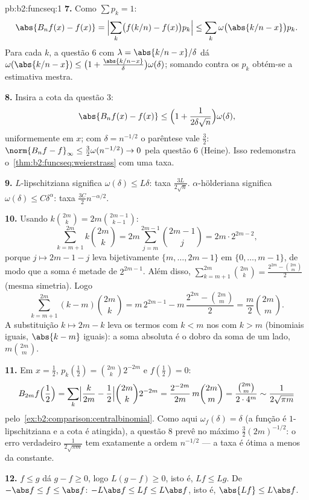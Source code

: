 \begin{solution}{pb:b2:funcseq:1}
\textbf{7.} Como $\sum p_k = 1$:
\[
\abs{B_nf(x) - f(x)}
= \Bigl|\sum_k\bigl(f(k/n) - f(x)\bigr)p_k\Bigr|
\leq \sum_k\omega\bigl(\abs{k/n - x}\bigr)p_k .
\]
Para cada $k$, a questão 6 com $\lambda = \abs{k/n - x}/\delta$
dá $\omega(\abs{k/n-x}) \leq \bigl(1 +
\frac{\abs{k/n-x}}\delta\bigr)\omega(\delta)$; somando contra
os $p_k$ obtém-se a estimativa mestra.

\textbf{8.} Insira a cota da questão 3:
\[
\abs{B_nf(x) - f(x)} \leq \Bigl(1 +
\frac{1}{2\delta\sqrt n}\Bigr)\omega(\delta),
\]
uniformemente em $x$; com $\delta = n^{-1/2}$ o parêntese vale
$\frac32$: $\norm{B_nf - f}_\infty \leq
\frac32\omega(n^{-1/2}) \to 0$ pela questão 6 (Heine). Isso
redemonstra o~\cref{thm:b2:funcseq:weierstrass} com uma taxa.

\textbf{9.} $L$-lipschitziana significa $\omega(\delta) \leq L\delta$:
taxa $\frac{3L}{2\sqrt n}$. $\alpha$-hölderiana significa
$\omega(\delta) \leq C\delta^\alpha$: taxa $\frac{3C}{2}
n^{-\alpha/2}$.

\textbf{10.} Usando $k\binom{2m}k = 2m\binom{2m-1}{k-1}$:
\[
\sum_{k=m+1}^{2m}k\binom{2m}k
= 2m\sum_{j=m}^{2m-1}\binom{2m-1}{j}
= 2m\cdot 2^{2m-2},
\]
porque $j \mapsto 2m-1-j$ leva bijetivamente $\{m,\dots,2m-1\}$ em
$\{0,\dots,m-1\}$, de modo que a soma é metade de $2^{2m-1}$. Além disso,
$\sum_{k=m+1}^{2m}\binom{2m}k = \frac{2^{2m} -
\binom{2m}m}{2}$ (mesma simetria). Logo
\[
\sum_{k=m+1}^{2m}(k-m)\binom{2m}k
= m\,2^{2m-1} - m\,\frac{2^{2m} - \binom{2m}m}{2}
= \frac m2\binom{2m}m .
\]
A substituição $k \mapsto 2m-k$ leva os termos com $k < m$
nos com $k > m$ (binomiais iguais, $\abs{k-m}$ iguais):
a soma absoluta é o dobro da soma de um lado, $m\binom{2m}m$.

\textbf{11.} Em $x = \frac12$, $p_k(\tfrac12) =
\binom{2m}k2^{-2m}$ e $f(\tfrac12) = 0$:
\[
B_{2m}f\Bigl(\frac12\Bigr)
= \sum_k\Bigl|\frac{k}{2m} - \frac12\Bigr|
\binom{2m}k 2^{-2m}
= \frac{2^{-2m}}{2m}\,m\binom{2m}m
= \frac{\binom{2m}m}{2\cdot4^m}
\sim \frac{1}{2\sqrt{\pi m}}
\]
pelo~\cref{ex:b2:comparison:centralbinomial}. Como aqui $\omega_f
(\delta) = \delta$ (a função é $1$-lipschitziana e a
cota é atingida), a questão 8 prevê no máximo
$\frac32(2m)^{-1/2}$: o erro verdadeiro $\frac{1}{2\sqrt{\pi m}}$
tem exatamente a ordem $n^{-1/2}$ --- a taxa é ótima a menos da
constante.

\textbf{12.} $f \leq g$ dá $g - f \geq 0$, logo $L(g-f) \geq
0$, isto é, $Lf \leq Lg$. De $-\abs f \leq f \leq \abs f$:
$-L\abs f \leq Lf \leq L\abs f$, isto é, $\abs{Lf} \leq
L\abs f$.


\end{solution}
